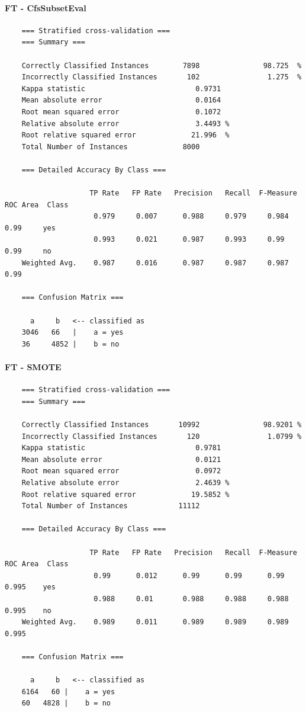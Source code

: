 \paragraph{FT - CfsSubsetEval}
{\footnotesize
	\begin{verbatim}
	=== Stratified cross-validation ===
	=== Summary ===
	
	Correctly Classified Instances        7898               98.725  %
	Incorrectly Classified Instances       102                1.275  %
	Kappa statistic                          0.9731
	Mean absolute error                      0.0164
	Root mean squared error                  0.1072
	Relative absolute error                  3.4493 %
	Root relative squared error             21.996  %
	Total Number of Instances             8000     
	
	=== Detailed Accuracy By Class ===
	
	                TP Rate   FP Rate   Precision   Recall  F-Measure   ROC Area  Class
	                 0.979     0.007      0.988     0.979     0.984      0.99     yes
	                 0.993     0.021      0.987     0.993     0.99       0.99     no
	Weighted Avg.    0.987     0.016      0.987     0.987     0.987      0.99 
	
	=== Confusion Matrix ===
	
	  a     b   <-- classified as
	3046   66   |    a = yes
	36     4852 |    b = no
	\end{verbatim}
}

\paragraph{FT - SMOTE}
{\footnotesize
	\begin{verbatim}
	=== Stratified cross-validation ===
	=== Summary ===
	
	Correctly Classified Instances       10992               98.9201 %
	Incorrectly Classified Instances       120                1.0799 %
	Kappa statistic                          0.9781
	Mean absolute error                      0.0121
	Root mean squared error                  0.0972
	Relative absolute error                  2.4639 %
	Root relative squared error             19.5852 %
	Total Number of Instances            11112     
	
	=== Detailed Accuracy By Class ===
	
	                TP Rate   FP Rate   Precision   Recall  F-Measure   ROC Area  Class
	                 0.99      0.012      0.99      0.99      0.99       0.995    yes
	                 0.988     0.01       0.988     0.988     0.988      0.995    no
	Weighted Avg.    0.989     0.011      0.989     0.989     0.989      0.995
	
	=== Confusion Matrix ===
	
	  a     b   <-- classified as
	6164   60 |    a = yes
	60   4828 |    b = no
	\end{verbatim}
}

